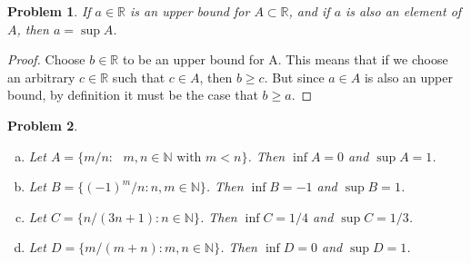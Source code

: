 \documentclass[12pt]{article}
\newtheorem{problem}{Problem}
\newcommand{\RR}{\ensuremath{\mathbb R}}
\newcommand{\NN}{\ensuremath{\mathbb N}}
\begin{document}
\begin{problem} %
If $a\in\RR$ is an upper bound for $A\subset \RR$, and if $a$ is also an element of $A$, then $a = \sup A$.
\end{problem}

\begin{proof}
Choose $b \in \RR$ to be an upper bound for A. This means that if we choose an arbitrary $c \in \RR$ such that $c \in A$, then $b \geq c$.
But since $a \in A$ is also an upper bound, by definition it must be the case that $b \geq a$.
\end{proof}


\begin{problem} %


\begin{enumerate}[(a)]
\item Let $A=\{m/n: \text{ $m,n\in\NN$ with $m<n$} \}$.  Then $\inf A = 0 $ and $\sup A = 1 $.
\item Let $B=\{(-1)^m/n: n,m\in\NN\}$.  Then $\inf B = -1 $ and $\sup B = 1 $.
\item Let $C=\{n/(3n+1): n\in\NN\}$.  Then $\inf C = 1/4 $ and $\sup C = 1/3$.
\item Let $D=\{m/(m+n):m,n\in\NN\}$.  Then $\inf D = 0 $ and $\sup D = 1 $.
\end{enumerate}
\end{problem}
\end{document}
